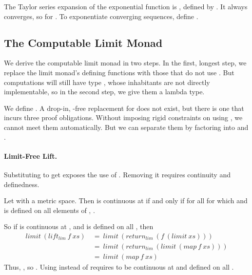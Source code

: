 \begin{example}[exponential]
The Taylor series expansion of the exponential function is , defined by
.
It always converges, so  for .
To exponentiate converging sequences, define .
\exampleqed
\end{example}

\subsection{The Computable Limit Monad}

We derive the computable limit monad in two steps. In the first, longest step, we replace the limit monad's defining functions with those that do not use . But computations will still have type \tlzfc{\lnat \to \metricuniv}, whose inhabitants are not directly implementable, so in the second step, we give them a lambda type.

We define . A drop-in, -free replacement for  does not exist, but there is one that incurs three proof obligations. Without imposing rigid constraints on using , we cannot meet them automatically. But we can separate them by factoring  into  and .

\paragraph{Limit-Free Lift.}
Substituting to get  exposes the use of . Removing it requires continuity and definedness.

\begin{lemma}
\label{lem:continuity}
Let  with  a metric space. Then  is continuous at  if and only if for all  for which  and  is defined on all elements of ,
.
\end{lemma}

So if  is continuous at , and  is defined on all , then
\begin{equation}
\begin{aligned}
  limit~(lift_{lim}~f~xs)
    &\ =\  limit~(return_{lim}~(f~(limit~xs))) \\
    &\ =\  limit~(return_{lim}~(limit~(map~f~xs))) \\
    &\ =\  limit~(map~f~xs)
\end{aligned}
\end{equation}
Thus, , so . Using  instead of  requires  to be continuous at  and defined on all .

